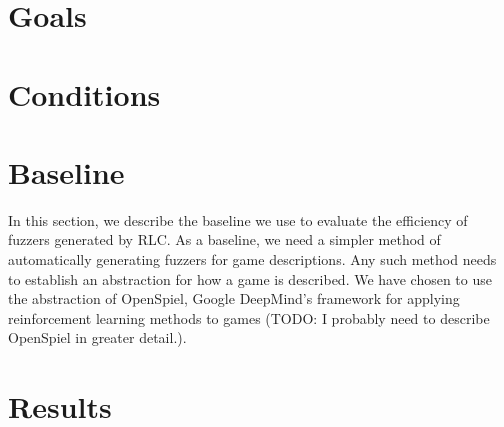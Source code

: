 \section{Goals}

\section{Conditions}

\section{Baseline}
In this section, we describe the baseline we use to evaluate the efficiency of fuzzers generated by RLC.
As a baseline, we need a simpler method of automatically generating fuzzers for game descriptions. Any such method
needs to establish an abstraction for how a game is described. We have chosen to use the abstraction of OpenSpiel, 
Google DeepMind's framework for applying reinforcement learning methods to games (TODO: I probably need to describe
 OpenSpiel in greater detail.).

\section{Results}